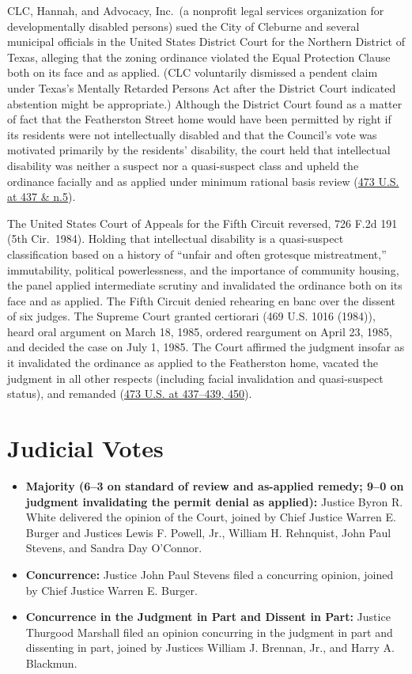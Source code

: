 \documentclass[12pt]{article}
\begin{document}
CLC, Hannah, and Advocacy, Inc.\ (a nonprofit legal services organization for developmentally disabled persons) sued the City of Cleburne and several municipal officials in the United States District Court for the Northern District of Texas, alleging that the zoning ordinance violated the Equal Protection Clause both on its face and as applied. (CLC voluntarily dismissed a pendent claim under Texas's Mentally Retarded Persons Act after the District Court indicated abstention might be appropriate.) Although the District Court found as a matter of fact that the Featherston Street home would have been permitted by right if its residents were not intellectually disabled and that the Council's vote was motivated primarily by the residents' disability, the court held that intellectual disability was neither a suspect nor a quasi-suspect class and upheld the ordinance facially and as applied under minimum rational basis review (\href{https://supreme.justia.com/cases/federal/us/473/432/}{473 U.S. at 437 \& n.5}).

The United States Court of Appeals for the Fifth Circuit reversed, 726 F.2d 191 (5th Cir.\ 1984). Holding that intellectual disability is a quasi-suspect classification based on a history of ``unfair and often grotesque mistreatment,'' immutability, political powerlessness, and the importance of community housing, the panel applied intermediate scrutiny and invalidated the ordinance both on its face and as applied. The Fifth Circuit denied rehearing en banc over the dissent of six judges. The Supreme Court granted certiorari (469 U.S. 1016 (1984)), heard oral argument on March 18, 1985, ordered reargument on April 23, 1985, and decided the case on July 1, 1985. The Court affirmed the judgment insofar as it invalidated the ordinance as applied to the Featherston home, vacated the judgment in all other respects (including facial invalidation and quasi-suspect status), and remanded (\href{https://supreme.justia.com/cases/federal/us/473/432/}{473 U.S. at 437--439, 450}).

\section{Judicial Votes}

\begin{itemize}
  \item \textbf{Majority (6--3 on standard of review and as-applied remedy; 9--0 on judgment invalidating the permit denial as applied):} Justice Byron R. White delivered the opinion of the Court, joined by Chief Justice Warren E. Burger and Justices Lewis F. Powell, Jr., William H. Rehnquist, John Paul Stevens, and Sandra Day O'Connor.
  \item \textbf{Concurrence:} Justice John Paul Stevens filed a concurring opinion, joined by Chief Justice Warren E. Burger.
  \item \textbf{Concurrence in the Judgment in Part and Dissent in Part:} Justice Thurgood Marshall filed an opinion concurring in the judgment in part and dissenting in part, joined by Justices William J. Brennan, Jr., and Harry A. Blackmun.
\end{itemize}
\end{document}
